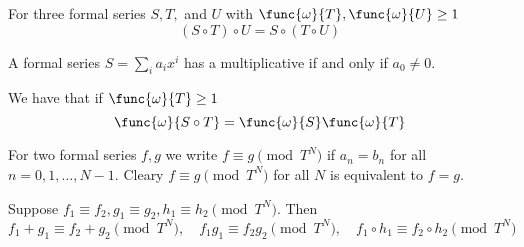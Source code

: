 \begin{proposition}
    For three formal series \(S, T,\) and \(U\) with \(\func{\omega}{T},\func{\omega}{U} \geq 1\)
    \begin{equation*}
        (S \circ T) \circ U = S \circ (T \circ U)
    \end{equation*}
\end{proposition}

\begin{proposition}
    A formal series \(S = \sum_i a_i x^i\) has a multiplicative if and only if \(a_0 \neq 0\).
\end{proposition}

\begin{proposition}
    We have that if \(\func{\omega}{T} \geq 1 \)
    \begin{equation*}
        \func{\omega}{S \circ T} = \func{\omega}{S} \func{\omega}{T}
    \end{equation*}
\end{proposition}

For two formal series \(f,g\) we write \(f \equiv g \pmod{T^N}\) if \(a_n = b_n\) for all \(n = 0,1,\dots , N- 1\). Cleary \(f \equiv g \pmod{T^N}\) for all \(N\) is equivalent to \(f = g\).
\begin{proposition}
    Suppose \(f_1 \equiv f_2, g_1 \equiv g_2, h_1 \equiv h_2 \pmod{T^N}\). Then 
    \begin{equation*}
        f_1 + g_1 \equiv f_2 + g_2 \pmod{T^N}, \quad f_1g_1 \equiv f_2g_2 \pmod{T^N}, \quad f_1 \circ h_1 \equiv f_2 \circ h_2 \pmod{T^N}
     \end{equation*} 
\end{proposition}


